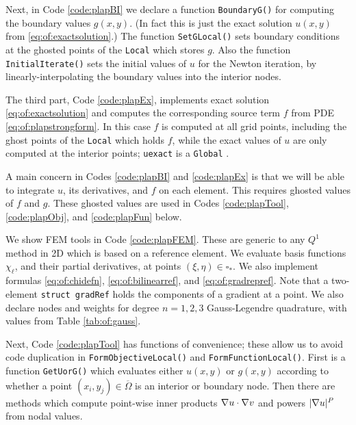 
Next, in Code \ref{code:plapBI} we declare a function \texttt{BoundaryG()} for computing the boundary values $g(x,y)$.  (In fact this is just the exact solution $u(x,y)$ from \eqref{eq:of:exactsolution}.)  The function \texttt{SetGLocal()} sets boundary conditions at the ghosted points of the \texttt{Local} \pVec which stores $g$.  Also the function \texttt{InitialIterate()} sets the initial values of $u$ for the Newton iteration, by linearly-interpolating the boundary values into the interior nodes.

The third part, Code \ref{code:plapEx}, implements exact solution \eqref{eq:of:exactsolution} and computes the corresponding source term $f$ from PDE \eqref{eq:of:plapstrongform}.  In this case $f$ is computed at all grid points, including the ghost points of the \texttt{Local} \pVec which holds $f$, while the exact values of $u$ are only computed at the interior points; \texttt{uexact} is a \texttt{Global} \pVec.

A main concern in Codes \ref{code:plapBI} and \ref{code:plapEx} is that we will be able to integrate $u$, its derivatives, and $f$ on each element.  This requires ghosted values of $f$ and $g$.  These ghosted values are used in Codes \ref{code:plapTool}, \ref{code:plapObj}, and \ref{code:plapFun} below.


We show FEM tools in Code \ref{code:plapFEM}.  These are generic to any $Q^1$ method in 2D which is based on a reference element.  We evaluate basis functions $\chi_\ell$, and their partial derivatives, at points $(\xi,\eta) \in \square_\ast$.  We also implement formulas \eqref{eq:of:chidefn}, \eqref{eq:of:bilinearref}, and \eqref{eq:of:gradrepref}.  Note that a two-element \texttt{struct gradRef} holds the components of a gradient at a point.  We also declare nodes and weights for degree $n=1,2,3$ Gauss-Legendre quadrature, with values from Table \ref{tab:of:gauss}.

Next, Code \ref{code:plapTool} has functions of convenience; these allow us to avoid code duplication in \texttt{FormObjectiveLocal()} and \texttt{FormFunctionLocal()}.  First is a function \texttt{GetUorG()} which evaluates either $u(x,y)$ or $g(x,y)$ according to whether a point $(x_i,y_j)\in\overline\Omega$ is an interior or boundary node.  Then there are methods which compute point-wise inner products $\nabla u\cdot \nabla v$ and powers $|\nabla u|^P$ from nodal values.

